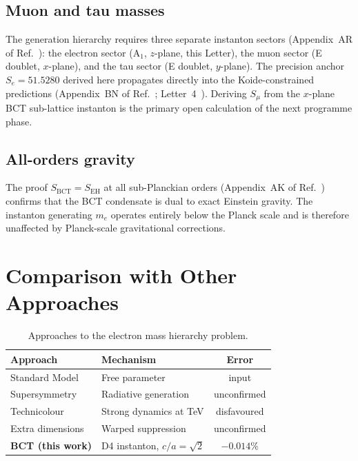 \documentclass[twocolumn,10pt,a4paper]{article}
\begin{document}
\subsection*{Muon and tau masses} The generation hierarchy requires three
separate instanton sectors (Appendix~AR of Ref.~\cite{monograph}): the
electron sector (A$_1$, $z$-plane, this Letter), the muon sector (E
doublet, $x$-plane), and the tau sector (E doublet, $y$-plane).  The
precision anchor $S_e = 51.5280$ derived here propagates directly into the
Koide-constrained predictions (Appendix~BN of Ref.~\cite{monograph};
Letter~4~\cite{generations}).  Deriving $S_\mu$ from the $x$-plane BCT
sub-lattice instanton is the primary open calculation of the next programme
phase.

\subsection*{All-orders gravity} The proof $S_\mathrm{BCT}=S_\mathrm{EH}$
at all sub-Planckian orders (Appendix~AK of Ref.~\cite{monograph}) confirms
that the BCT condensate is dual to exact Einstein gravity. The instanton
generating $m_e$ operates entirely below the Planck scale and is
therefore unaffected by Planck-scale gravitational corrections.

\section*{Comparison with Other Approaches}

\begin{table}[h!]
\caption{Approaches to the electron mass hierarchy problem.}
\label{tab:compare}
\renewcommand{\arraystretch}{1.20}
\setlength{\tabcolsep}{5pt}
\begin{tabular}{@{}p{1.9cm}p{2.8cm}c@{}}
\toprule
Approach & Mechanism & Error \\
\midrule
Standard Model    & Free parameter     & input \\
Supersymmetry     & Radiative generation & unconfirmed \\
Technicolour      & Strong dynamics at TeV & disfavoured \\
Extra dimensions  & Warped suppression & unconfirmed \\
\textbf{BCT (this work)} & D4 instanton, $c/a{=}\sqrt{2}$ & $\mathbf{-0.014\%}$ \\
\bottomrule
\end{tabular}
\end{table}
\end{document}
